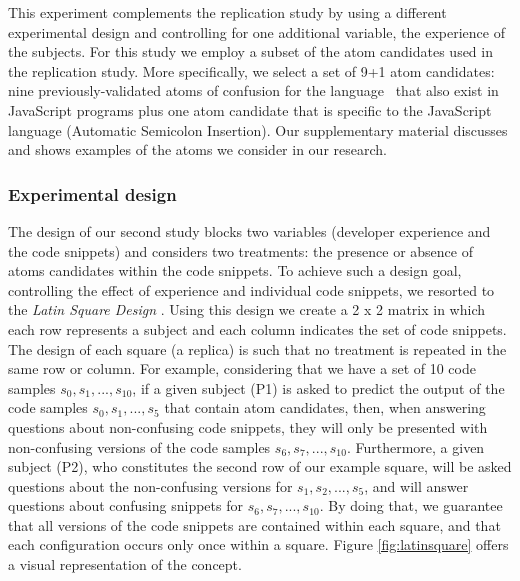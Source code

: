 This experiment complements the replication study by using a different experimental design and controlling for one additional variable, the experience of the subjects. For this study we employ a subset of the atom candidates used in the replication study. More specifically, we
select a set of 9+1 atom candidates: nine previously-validated atoms of confusion for the \clang language~\cite{DBLP:conf/sigsoft/GopsteinIYDZYC17} that also exist in JavaScript programs plus one atom candidate that is specific to the JavaScript language (Automatic Semicolon Insertion). 
Our supplementary material discusses and shows examples of the atoms we consider in our research.

\subsubsection*{Experimental design} 

The design of our second study blocks two variables
(developer experience and the code snippets) and
considers two treatments: the presence or absence of 
atoms candidates within the code snippets. 
To achieve such a design goal, controlling the effect of experience and individual code snippets, we resorted to the \textit{Latin Square Design} \cite{Hunter-Experimenters}. Using this design we create a 2 x 2 matrix in which each row represents a subject and each column indicates the set of code snippets. The design of each square (a replica) is such that no treatment is repeated in the same row or column. For example, considering that we have a set of 10
code samples $s_0, s_1, ..., s_{10}$, if a given subject (P1) is asked to predict the output of the code samples $s_0, s_1, ..., s_5$ that contain atom candidates, then, when answering questions about non-confusing code snippets, they will only be presented with non-confusing versions of the code samples $s_6, s_7,..., s_{10}$. Furthermore, a given subject (P2), who constitutes the second row of our example square, will be asked questions about the non-confusing versions for $s_1, s_2, ..., s_5$, and will answer questions about confusing snippets for $s_6, s_7,..., s_{10}$. By doing that, we guarantee that all versions of the code snippets are contained within each square, and that each configuration occurs only once within a square. Figure \ref{fig:latinsquare} offers a visual representation of the concept.

